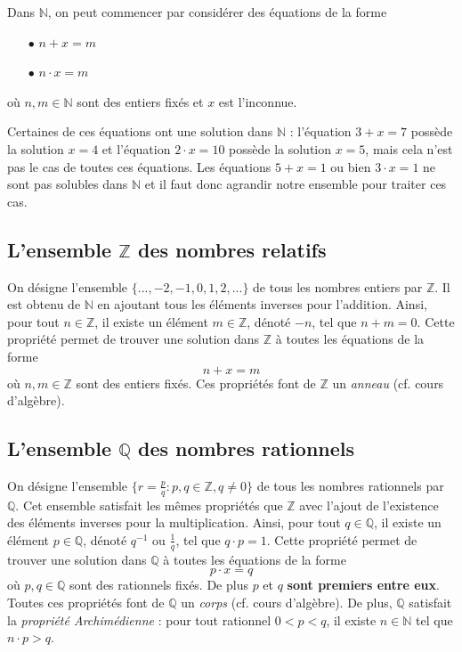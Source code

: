 \documentclass[oneside,11pt,french,table]{book}
\theoremstyle{definition}
\theoremstyle{plain}
\theoremstyle{remark}
\begin{document}
Dans $\mathbb N$, on peut commencer par considérer des équations de la forme
\begin{itemize}
    \item[$\bullet$] $n + x = m$
    \item[$\bullet$] $n \cdot x = m$
\end{itemize}
où $n,m \in \mathbb N$ sont des entiers fixés et $x$ est l'inconnue. 

Certaines de ces équations ont une solution dans $\mathbb N$ : l'équation $3 + x = 7$ possède la solution $x = 4$ et l'équation $2 \cdot x = 10$ possède la solution $x = 5$, mais cela n'est pas le cas de toutes ces équations. Les équations $5 + x = 1$ ou bien $3 \cdot x = 1$ ne sont pas solubles dans $\mathbb N$ et il faut donc agrandir notre ensemble pour traiter ces cas.
\subsection{L'ensemble $\mathbb{Z}$ des nombres relatifs}

On désigne l'ensemble $\{...,-2,-1,0,1,2,...\}$ de tous les nombres entiers par $\mathbb{Z}$. Il est obtenu de $\mathbb N$ en ajoutant tous les éléments inverses pour l'addition. Ainsi, pour tout $n \in \mathbb Z$, il existe un élément $m \in \mathbb Z$, dénoté $-n$, tel que $n + m = 0$. Cette propriété permet de trouver une solution dans $\mathbb Z$ à toutes les équations de la forme
$$n + x = m$$
où $n,m \in \mathbb Z$ sont des entiers fixés. Ces propriétés font de $\mathbb{Z}$ un \textit{anneau} (cf. cours d'algèbre).

\subsection{L'ensemble $\mathbb{Q}$ des nombres rationnels}
On désigne l'ensemble $\displaystyle \{r=\frac{p}{q} : p,q \in \mathbb Z, q \neq 0\}$ de tous les nombres rationnels par $\mathbb{Q}$. Cet ensemble satisfait les mêmes propriétés que $\mathbb Z$ avec l'ajout de l'existence des éléments inverses pour la multiplication. Ainsi, pour tout $q \in \mathbb Q$, il existe un élément $p \in \mathbb{Q}$, dénoté $q^{-1}$ ou $\frac{1}{q}$, tel que $q \cdot p = 1$. Cette propriété permet de trouver une solution dans $\mathbb Q$ à toutes les équations de la forme
$$p \cdot x = q$$
où $p,q \in \mathbb Q$ sont des rationnels fixés. De plus $p$ et $q$ \textbf{sont premiers entre eux}. Toutes ces propriétés font de $\mathbb{Q}$ un \textit{corps} (cf. cours d'algèbre). De plus, $\mathbb{Q}$ satisfait la \textit{propriété Archimédienne} : pour tout rationnel $0 < p < q$, il existe $n \in \mathbb{N}$ tel que $n \cdot p > q$.
\end{document}

